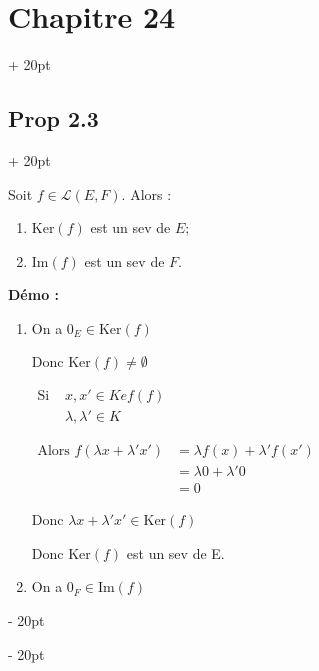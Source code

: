 \documentclass[12pt]{article}
\newcommand{\ind}[1][20pt]{\advance\leftskip + #1}
\newcommand{\deind}[1][20pt]{\advance\leftskip - #1}
\newenvironment{indt}[2][20pt]{#2 \par \ind[#1]}{\par \deind}
\begin{document}
  \begin{indt}{\section*{Chapitre 24}}
    \begin{indt}{\subsection*{Prop 2.3}}
    
    
      Soit $f\in\mathcal{L}(E,F)$. Alors :
      
      \vspace{-10pt}
      
      \begin{enumerate}[leftmargin=2cm,rightmargin=2cm]
      \item $\mathrm{Ker}(f)$ est un sev de $E$;
      \item $\mathrm{Im}(f)$ est un sev de $F$.
      \end{enumerate}
      
      
      \textbf{Démo :}
      
      
      \begin{enumerate}[leftmargin=2cm,rightmargin=2cm]
      \item On a $0_E\in\mathrm{Ker}(f)$
      
      Donc $\mathrm{Ker}(f)\not =\emptyset$
      
      $\begin{array}{ll}
        \text{Si } & x,x'\in Kef(f)
        \\
        & \lambda, \lambda'\in K
      \end{array}$
      
      $\begin{array}{lll}
        \text{Alors }f(\lambda x+\lambda' x') & =\lambda f(x)+\lambda' f(x')
        \\
        & =\lambda 0 +\lambda' 0
        \\
        & =0
      \end{array}$
      
      Donc $\lambda x +\lambda' x'\in\mathrm{Ker}(f)$
      
      Donc $\mathrm{Ker}(f)$ est un sev de E.
      
      \item On a $0_F\in\mathrm{Im}(f)$
      

\end{enumerate}
\end{indt}
\end{indt}
\end{document}
